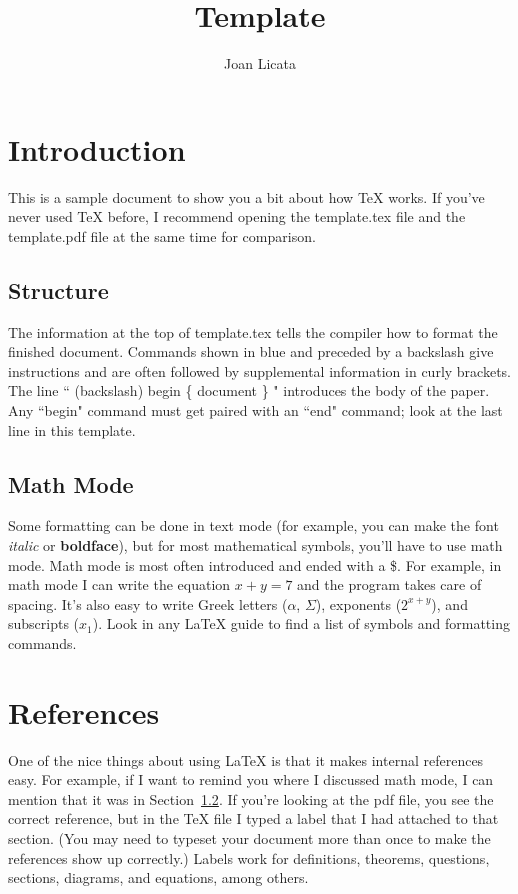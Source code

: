 \documentclass[11pt]{article}
\theoremstyle{plain}
\theoremstyle{definition}
\begin{document}
 


\title{Template}
\author{Joan Licata}
\maketitle

\section{Introduction}

This is a sample document to show you a bit about how TeX works.  If you've never used TeX before, I recommend opening the template.tex file and the template.pdf file at the same time for comparison.  

\subsection{Structure}
The information at the top of template.tex tells the compiler how to format the finished document.  Commands shown in blue and preceded by a backslash give instructions and are often followed by supplemental information in curly brackets.  The  line `` (backslash) begin \{ document \} "  introduces the body of the paper.  Any ``begin" command must get paired with an ``end" command; look at the last line in this template.

\subsection{Math Mode}\label{section:mathmode}
Some formatting can be done in text mode (for example, you can make the font \textit{italic} or \textbf{boldface}), but for most mathematical symbols, you'll have to use math mode.  Math mode is most often introduced and ended with a \$.  For example, in math mode I can write the equation $x+ y=7$ and the program takes care of spacing.  It's also easy to write Greek letters ($\alpha$, $\Sigma$), exponents ($2^{x+y}$), and subscripts ($x_1$).  Look in any LaTeX guide to find a list of symbols and formatting commands.  

\section{References}
One of the nice things about using LaTeX is that it makes internal references easy.  For example, if I want to remind you where I discussed math mode, I can mention that it was in Section~\ref{section:mathmode}.  If you're looking at the pdf file, you see the correct reference, but in the TeX file I typed a label that I had attached to that section.  (You may need to typeset your document more than once to make the references show up correctly.)  Labels work for definitions, theorems, questions, sections, diagrams, and equations, among others.

 
 
\end{document}
